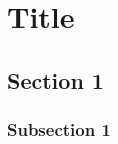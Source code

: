 
\chapter{Title}

\lipsum[50]

\section{Section 1}

\lipsum[20]

\subsection{Subsection 1}

\lipsum[40]
